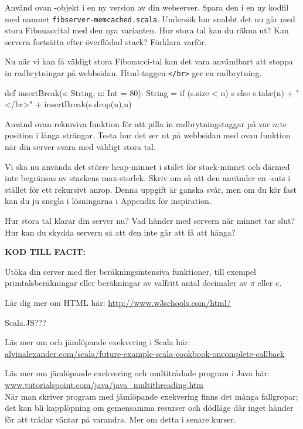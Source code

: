 \Subtask Använd ovan -objekt i en ny version av din webserver. Spara den i en ny kodfil med namnet \texttt{fibserver-memcached.scala}. Undersök hur snabbt det nu går med stora Fibonaccital med den nya varianten. Hur stora tal kan du räkna ut? Kan servern fortsätta efter överflödad stack? Förklara varför.

\Subtask Nu när vi kan få väldigt stora Fibonacci-tal kan det vara användbart att stoppa in radbrytningar på webbsidan. Html-taggen \texttt{</br>} ger en radbrytning. 
\begin{Code}
  def insertBreak(s: String, n: Int = 80): String = {
    if (s.size < n) s 
    else s.take(n) + "</br>" + insertBreak(s.drop(n),n)
  }
\end{Code}
Använd ovan rekursiva funktion för att pilla in radbrytningstaggar på var $n$:te position i långa strängar. Testa hur det ser ut på webbsidan med ovan funktion när din server svara med väldigt stora tal.

\Subtask Vi ska nu använda det större heap-minnet i stälet för stack-minnet och därmed inte begränsas av stackens max-storlek. Skriv om  så att den använder en -sats i stället för ett rekursivt anrop. Denna uppgift är ganska svår, men om du kör fast kan du ju snegla i lösningarna i Appendix för inspiration. 

Hur stora tal klarar din server nu? Vad händer med servern när minnet tar slut? Hur kan du skydda servern så att den inte går att få att hänga?

\textbf{KOD TILL FACIT:}

\Task Utöka din server med fler beräkningsintensiva funktioner, till exempel primtalsberäkningar eller beräkningar av valfritt antal decimaler av $\pi$ eller $e$.

\Task Lär dig mer om HTML här: \url{http://www.w3schools.com/html/}

\Task Scala.JS???


\Task Läs mer om  och jämlöpande exekvering i Scala här:\\
\href{http://alvinalexander.com/scala/future-example-scala-cookbook-oncomplete-callback}{alvinalexander.com/scala/future-example-scala-cookbook-oncomplete-callback}

\Task Läs mer om jämlöpande exekvering och multitrådade program i Java här: \href{http://www.tutorialspoint.com/java/java_multithreading.htm}{www.tutorialspoint.com/java/java\_multithreading.htm}  \\
\noindent När man skriver program med jämlöpande exekvering finns det många fallgropar; det kan bli kapplöpning  om gemensamma resurser och dödläge  där inget händer för att trådar väntar på varandra. Mer om detta i senare kurser. 

